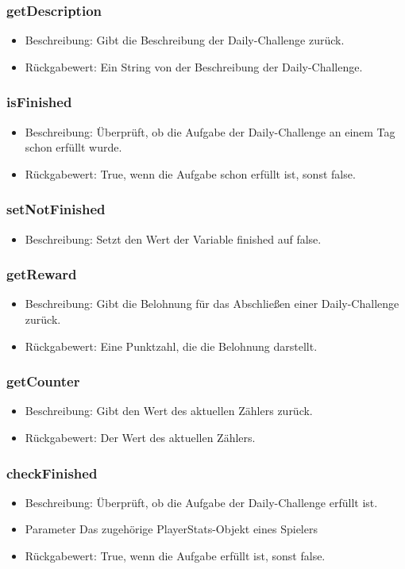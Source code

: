 \documentclass[a4paper]{scrreprt}
\begin{document}
   \subsubsection{getDescription}
   \begin{itemize}
     \item Beschreibung: Gibt die Beschreibung der Daily-Challenge zurück.
     \item Rückgabewert: Ein String von der Beschreibung der Daily-Challenge.
    \end{itemize}
  \subsubsection{isFinished}
  \begin{itemize}
  	\item Beschreibung: Überprüft, ob die Aufgabe der Daily-Challenge an einem Tag schon erfüllt wurde.
	\item Rückgabewert: True, wenn die Aufgabe schon erfüllt ist, sonst false.
  \end{itemize}
  \subsubsection{setNotFinished}
  \begin{itemize}
	\item Beschreibung: Setzt den Wert der Variable finished auf false.
  \end{itemize}
   \subsubsection{getReward}
   \begin{itemize}
   \item Beschreibung: Gibt die Belohnung für das Abschließen einer Daily-Challenge zurück.
   \item Rückgabewert: Eine Punktzahl, die die Belohnung darstellt.
   \end{itemize}
   \subsubsection{getCounter}
   \begin{itemize}
	\item Beschreibung: Gibt den Wert des aktuellen Zählers zurück.
	\item Rückgabewert: Der Wert des aktuellen Zählers.
   \end{itemize}
   \subsubsection{checkFinished}
   \begin{itemize}
   	\item Beschreibung: Überprüft, ob die Aufgabe der Daily-Challenge erfüllt ist.
   	\item Parameter Das zugehörige PlayerStats-Objekt eines Spielers
   	\item Rückgabewert: True, wenn die Aufgabe erfüllt ist, sonst false.
   \end{itemize}
   
\end{document}
